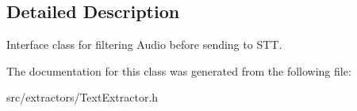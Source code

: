 \subsection{Detailed Description}
Interface class for filtering Audio before sending to S\+TT. 

The documentation for this class was generated from the following file\+:\begin{DoxyCompactItemize}
\item 
src/extractors/Text\+Extractor.\+h\end{DoxyCompactItemize}

